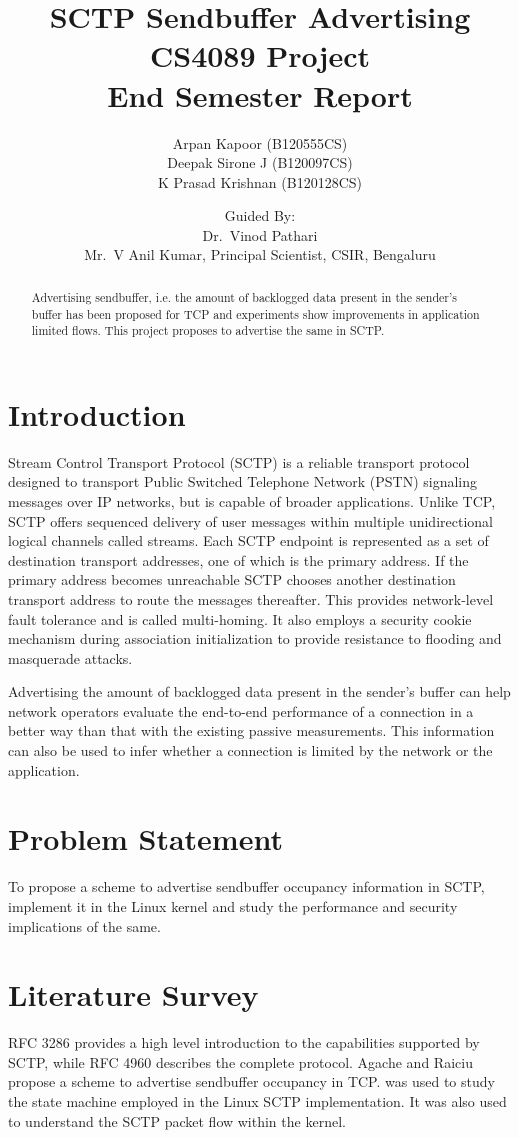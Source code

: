 \documentclass[a4paper,11pt]{article}
\title{SCTP Sendbuffer Advertising\\
	{\normalsize CS4089 Project\\
		End Semester Report}}
\author{Arpan Kapoor (B120555CS)\\
	Deepak Sirone J (B120097CS)\\
	K Prasad Krishnan (B120128CS)\and
	Guided By:\\ Dr.~Vinod Pathari\\
	Mr.~V Anil Kumar, Principal Scientist, CSIR, Bengaluru}
\begin{document}
\maketitle

\begin{abstract}
Advertising sendbuffer, i.e.
the amount of backlogged data present in the sender's buffer 
has been proposed for TCP and experiments show
improvements in application limited flows.
This project proposes to advertise the same in SCTP.
\end{abstract}

\section{Introduction}
Stream Control Transport Protocol (SCTP) is a reliable transport protocol
designed to transport Public Switched Telephone Network (PSTN) signaling
messages over IP networks, but is capable of broader applications.
Unlike TCP, SCTP offers sequenced delivery of user messages within multiple
unidirectional logical channels called streams.
Each SCTP endpoint is represented as a set of destination transport addresses,
one of which is the primary address. If the primary address becomes unreachable
SCTP chooses another destination transport address to route the messages 
thereafter. This provides network-level fault tolerance and is called
multi-homing.
It also employs a security cookie mechanism during association initialization
to provide resistance to flooding and masquerade attacks.

Advertising the amount of backlogged data present in the sender's buffer can
help network operators evaluate the end-to-end performance of a connection
in a better way than that with the existing passive measurements.
This information can also be used to infer whether a connection is limited
by the network or the application.

\section{Problem Statement}
To propose a scheme to advertise sendbuffer occupancy information in SCTP,
implement it in the Linux kernel and study the performance and security
implications of the same.

\section{Literature Survey}
RFC 3286 \cite{rfc3286} provides a high level introduction to the capabilities
supported by SCTP, while RFC 4960 \cite{rfc4960} describes the complete
protocol. Agache and Raiciu \cite{tcp-sndbufadv} propose a scheme to advertise
sendbuffer occupancy in TCP. \cite{budigerelinux} was used to study the state
machine employed in the Linux SCTP implementation. It was also used to 
understand the SCTP packet flow within the kernel.
\end{document}
